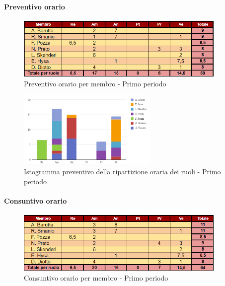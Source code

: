 \paragraph{Preventivo orario}

\begin{figure}[H] 
    \centering
    \includegraphics[width=0.9\textwidth]{../Images/preventivoOrario1Periodo.png}
    \caption{Preventivo orario per membro - Primo periodo}
    \label{fig:Preventivo_orario_1}
\end{figure}

\vspace{0.6cm}

\begin{figure}[H]
    \centering
    \includegraphics[width=0.6\textwidth]{../Images/preventivoDivisioneRuoli1Periodo.png}
    \caption{Istogramma preventivo della ripartizione oraria dei ruoli - Primo periodo}
    \label{fig:Preventivo_ripartizione_oraria_1}
\end{figure}

\pagebreak

\paragraph{Consuntivo orario}

\begin{figure}[H]
    \centering
    \includegraphics[width=0.9\textwidth]{../Images/consuntivoOrario1Periodo.png}
    \caption{Consuntivo orario per membro - Primo periodo}
    \label{fig:Constuntivo_orario_1}
\end{figure}

